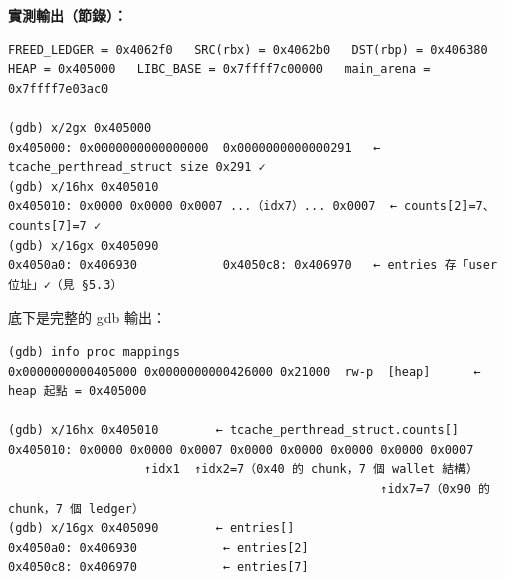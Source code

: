 \documentclass[10pt,a4paper]{article}
\begin{document}
\textbf{實測輸出（節錄）：}

\begin{Verbatim}[breaklines=true,breakanywhere=true,breakautoindent=false,fontsize=\fontsize{7.0}{9.5}\selectfont]
FREED_LEDGER = 0x4062f0   SRC(rbx) = 0x4062b0   DST(rbp) = 0x406380
HEAP = 0x405000   LIBC_BASE = 0x7ffff7c00000   main_arena = 0x7ffff7e03ac0

(gdb) x/2gx 0x405000
0x405000: 0x0000000000000000  0x0000000000000291   ← tcache_perthread_struct size 0x291 ✓
(gdb) x/16hx 0x405010
0x405010: 0x0000 0x0000 0x0007 ...（idx7）... 0x0007  ← counts[2]=7、counts[7]=7 ✓
(gdb) x/16gx 0x405090
0x4050a0: 0x406930            0x4050c8: 0x406970   ← entries 存「user 位址」✓（見 §5.3）
\end{Verbatim}

底下是完整的 gdb 輸出：

\begin{Verbatim}[breaklines=true,breakanywhere=true,breakautoindent=false,fontsize=\fontsize{7.0}{9.5}\selectfont]
(gdb) info proc mappings
0x0000000000405000 0x0000000000426000 0x21000  rw-p  [heap]      ← heap 起點 = 0x405000

(gdb) x/16hx 0x405010        ← tcache_perthread_struct.counts[]
0x405010: 0x0000 0x0000 0x0007 0x0000 0x0000 0x0000 0x0000 0x0007
                   ↑idx1  ↑idx2=7（0x40 的 chunk，7 個 wallet 結構）
                                                    ↑idx7=7（0x90 的 chunk，7 個 ledger）
(gdb) x/16gx 0x405090        ← entries[]
0x4050a0: 0x406930            ← entries[2]
0x4050c8: 0x406970            ← entries[7]
\end{Verbatim}
\end{document}
